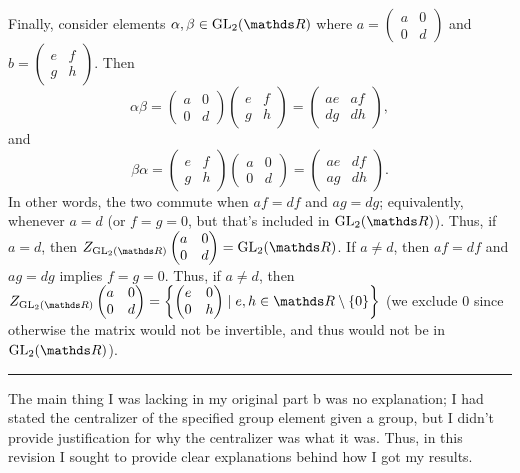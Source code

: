 \documentclass{homework}
\begin{document}
\begin{solution}
  Finally, consider elements $\alpha,\beta\in \GL_2(\R)$ where $a=\begin{pmatrix} a&0\\0&d
    \end{pmatrix} $ and $b=\begin{pmatrix} e&f\\g&h \end{pmatrix} $. Then
  \[
    \alpha\beta=\begin{pmatrix} a&0\\0&d \end{pmatrix} \begin{pmatrix} e&f\\g&h \end{pmatrix}
    =\begin{pmatrix} ae & af \\ dg & dh \end{pmatrix} 
  ,\] and \[
  \beta\alpha=\begin{pmatrix} e&f\\g&h \end{pmatrix} \begin{pmatrix} a&0\\0&d \end{pmatrix}
  =\begin{pmatrix} ae&df\\ ag & dh \end{pmatrix} 
.\] In other words, the two commute when $af=df$ and $ag=dg$; equivalently, whenever $a=d$ (or
  $f=g=0$, but that's included in $\GL_2(\R)$). Thus, if $a=d$, then $Z_{\GL_2(\R)}\begin{pmatrix}
    a&0\\0&d \end{pmatrix} =\GL_2(\R)$. If $a\neq d$, then $af=df$ and $ag=dg$ implies $f=g=0$.
    Thus, if $a\neq d$, then $Z_{\GL_2(\R)}\begin{pmatrix} a&0\\0&d
      \end{pmatrix}=\left\{\begin{pmatrix} e&0\\0&h \end{pmatrix} \mid e,h\in \R\setminus \{ 0
      \}\right\}$ (we exclude $0$ since otherwise the matrix would not be invertible, and thus would
      not be in $\GL_2(\R)$).
\end{solution}

\vspace{2mm}
\hrule
\vspace{2mm}

The main thing I was lacking in my original part b was no explanation; I had stated the centralizer
of the specified group element given a group, but I didn't provide justification for why the
centralizer was what it was. Thus, in this revision I sought to provide clear explanations behind
how I got my results.
\end{document}
